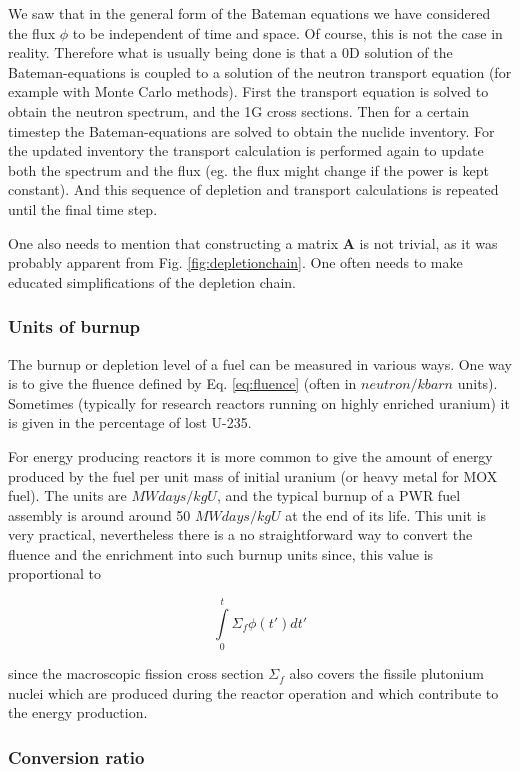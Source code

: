 We saw that in the general form of the Bateman equations we have considered the flux $\phi$ to be independent of time and space. Of course, this is not the case in reality. Therefore what is usually being done is that a 0D solution of the Bateman-equations is coupled to a solution of the neutron transport equation (for example with Monte Carlo methods). First the transport equation is solved to obtain the neutron spectrum, and the 1G cross sections. Then for a certain timestep the Bateman-equations are solved to obtain the nuclide inventory. For the updated inventory the transport calculation is performed again to update both the spectrum and the flux (eg. the flux might change if the power is kept constant). And this sequence of depletion and transport calculations is repeated until the final time step. 

One also needs to mention that constructing a matrix $\mathbf{A}$ is not trivial, as it was probably apparent from Fig. \ref{fig:depletionchain}. One often needs to make educated simplifications of the depletion chain. 

\subsubsection*{Units of burnup}

The burnup or depletion level of a fuel can be measured in various ways. One way is to give the fluence defined by Eq. \eqref{eq:fluence} (often in $neutron/kbarn$ units). Sometimes (typically for research reactors running on highly enriched uranium) it is given in the percentage of lost U-235. 

For energy producing reactors it is more common to give the amount of energy produced by the fuel per unit mass of initial uranium (or heavy metal for MOX fuel). The units are $MWdays/kgU$, and the typical burnup of a PWR fuel assembly is around around 50 $MWdays/kgU$ at the end of its life. This unit is very practical, nevertheless there is a no straightforward way to convert the fluence and the enrichment into such burnup units since, this value is proportional to 

\[
\int\limits_0^t \Sigma_f \phi(t')dt'
\]

\noindent since the macroscopic fission cross section $\Sigma_f$ also covers the fissile plutonium nuclei which are produced during the reactor operation and which contribute to the energy production. 

\subsubsection{Conversion ratio}

